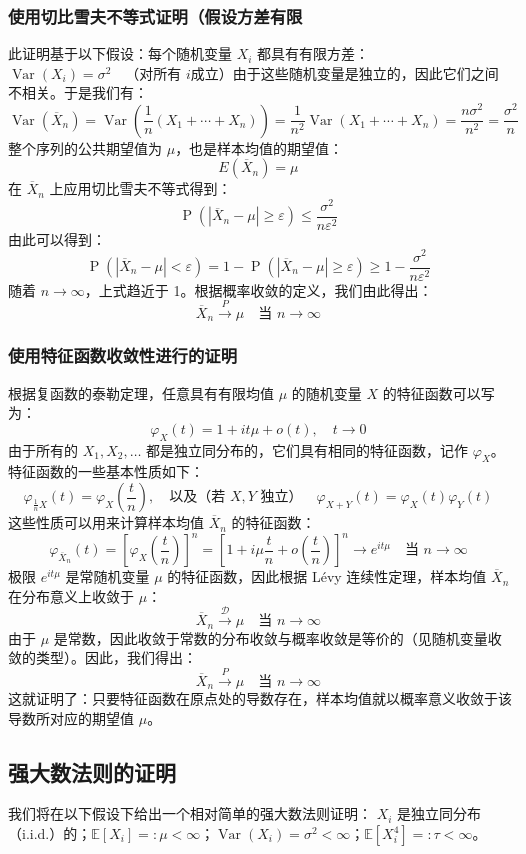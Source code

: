 \subsubsection{使用切比雪夫不等式证明（假设方差有限}
此证明基于以下假设：每个随机变量 $X_i$ 都具有有限方差：$\operatorname{Var}(X_i) = \sigma^2 \quad \text{（对所有 } i \text{成立）}$由于这些随机变量是独立的，因此它们之间不相关。于是我们有：
$$
\operatorname{Var}(\overline{X}_n) = \operatorname{Var}\left(\frac{1}{n}(X_1 + \cdots + X_n)\right) = \frac{1}{n^2} \operatorname{Var}(X_1 + \cdots + X_n) = \frac{n\sigma^2}{n^2} = \frac{\sigma^2}{n}~
$$
整个序列的公共期望值为 $\mu$，也是样本均值的期望值：
$$
E(\overline{X}_n) = \mu~
$$
在 $\overline{X}_n$ 上应用切比雪夫不等式得到：
$$
\operatorname{P}(|\overline{X}_n - \mu| \geq \varepsilon) \leq \frac{\sigma^2}{n\varepsilon^2}~
$$
由此可以得到：
$$
\operatorname{P}(|\overline{X}_n - \mu| < \varepsilon) = 1 - \operatorname{P}(|\overline{X}_n - \mu| \geq \varepsilon) \geq 1 - \frac{\sigma^2}{n\varepsilon^2}~
$$
随着 $n \to \infty$，上式趋近于 1。根据概率收敛的定义，我们由此得出：
$$
\overline{X}_n \overset{P}{\longrightarrow} \mu \quad \text{当 } n \to \infty~
$$
\subsubsection{使用特征函数收敛性进行的证明}
根据复函数的泰勒定理，任意具有有限均值 $\mu$ 的随机变量 $X$ 的特征函数可以写为：
$$
\varphi_X(t) = 1 + it\mu + o(t), \quad t \to 0~
$$
由于所有的 $X_1, X_2, \ldots$ 都是独立同分布的，它们具有相同的特征函数，记作 $\varphi_X$。
特征函数的一些基本性质如下：
$$
\varphi_{\frac{1}{n}X}(t) = \varphi_X\left(\frac{t}{n}\right),\quad \text{以及（若 } X, Y \text{ 独立）} \quad \varphi_{X+Y}(t) = \varphi_X(t)\varphi_Y(t)~
$$
这些性质可以用来计算样本均值 $\overline{X}_n$ 的特征函数：
$$
\varphi_{\overline{X}_n}(t) = \left[\varphi_X\left(\frac{t}{n}\right)\right]^n = \left[1 + i\mu \frac{t}{n} + o\left(\frac{t}{n}\right)\right]^n \longrightarrow e^{it\mu} \quad \text{当 } n \to \infty ~
$$
极限 $e^{it\mu}$ 是常随机变量 $\mu$ 的特征函数，因此根据 Lévy 连续性定理，样本均值 $\overline{X}_n$ 在分布意义上收敛于 $\mu$：
$$
\overline{X}_n \xrightarrow{\mathcal{D}} \mu \quad \text{当 } n \to \infty~
$$
由于 $\mu$ 是常数，因此收敛于常数的分布收敛与概率收敛是等价的（见随机变量收敛的类型）。因此，我们得出：
$$
\overline{X}_n \xrightarrow{P} \mu \quad \text{当 } n \to \infty~
$$
这就证明了：只要特征函数在原点处的导数存在，样本均值就以概率意义收敛于该导数所对应的期望值 $\mu$。
\subsection{强大数法则的证明}
我们将在以下假设下给出一个相对简单的强大数法则证明： $X_i$ 是独立同分布（i.i.d.）的；$\mathbb{E}[X_i] =: \mu < \infty$；$\operatorname{Var}(X_i) = \sigma^2 < \infty$；$\mathbb{E}[X_i^4] =: \tau < \infty$。

